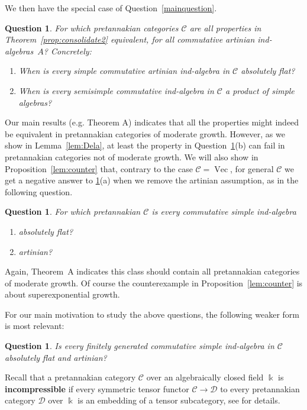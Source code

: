 \documentclass[11pt]{amsart}
\def\Ds{\mathscr{D}}
\def\cC{\mathscr{C}}
\def\bk{\Bbbk}
\def\Vec{\operatorname{Vec}}
\newtheorem{question}[thm]{Question}
\theoremstyle{definition}
\theoremstyle{remark}
\numberwithin{equation}{section}
\begin{document}
We then have the special case of Question~\ref{mainquestion}.
\begin{question}\label{q:comm}\label{q:main}
    For which pretannakian categories $\cC$ are all properties in Theorem~\ref{prop:consolidate2} equivalent, for all commutative artinian ind-algebras~$A$? Concretely:
    \begin{enumerate}
        \item[(a)] When is every simple commutative artinian ind-algebra in $\cC$ absolutely flat?
        \item[(b)] When is every semisimple commutative ind-algebra in $\cC$ a product of simple algebras?
    \end{enumerate}
\end{question}


Our main results (e.g. Theorem A) indicates that all the properties might indeed be equivalent in pretannakian categories of moderate growth. However, 
as we show in Lemma~\ref{lem:Dela}, at least the property in Question~\ref{q:comm}(b) can fail in pretannakian categories not of moderate growth.
We will also show in Proposition~\ref{lem:counter} that, contrary to the case $\cC=\Vec$, for general $\cC$ we get a negative answer to \ref{q:comm}(a) when we remove the artinian assumption, as in the following question.
\begin{question}\label{q:nonart}
For which pretannakian $\cC$ is every commutative simple ind-algebra
\begin{enumerate}
    \item absolutely flat?
    \item artinian?
\end{enumerate} 
\end{question}
Again, Theorem~A indicates this class should contain all pretannakian categories of moderate growth. Of course the counterexample in Proposition~\ref{lem:counter} is about superexponential growth. 

For our main motivation to study the above questions, the following weaker form is most relevant:
\begin{question}\label{Q4Os}
    Is every finitely generated commutative simple ind-algebra in $\cC$ absolutely flat and artinian?
\end{question}


Recall that a pretannakian category $\cC$ over an algebraically closed field $\bk$ is {\bf incompressible} if every symmetric tensor functor $\cC\to\Ds$ to every pretannakian category $\Ds$ over $\bk$ is an embedding of a tensor subcategory, see \cite{CEO} for details.
\end{document}
